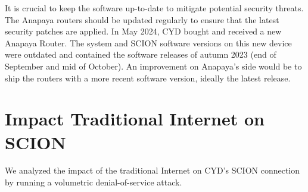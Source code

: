 It is crucial to keep the software up-to-date to mitigate potential security threats.
The Anapaya routers should be updated regularly to ensure that the latest security patches are applied.
In May 2024, CYD bought and received a new Anapaya Router.
The system and SCION software versions on this new device were outdated and contained the software releases of autumn 2023 (end of September and mid of October).
An improvement on Anapaya's side would be to ship the routers with a more recent software version, ideally the latest release.




\section{Impact Traditional Internet on SCION}
We analyzed the impact of the traditional Internet on CYD's SCION connection by running a volumetric denial-of-service attack.


